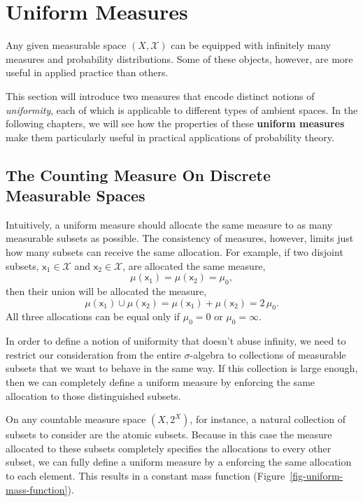 \documentclass[
  letterpaper,
  DIV=11,
  numbers=noendperiod]{scrartcl}
\begin{document}
\section{Uniform Measures}\label{uniform-measures}

Any given measurable space \((X, \mathcal{X})\) can be equipped with
infinitely many measures and probability distributions. Some of these
objects, however, are more useful in applied practice than others.

This section will introduce two measures that encode distinct notions of
\emph{uniformity}, each of which is applicable to different types of
ambient spaces. In the following chapters, we will see how the
properties of these \textbf{uniform measures} make them particularly
useful in practical applications of probability theory.

\subsection{The Counting Measure On Discrete Measurable
Spaces}\label{the-counting-measure-on-discrete-measurable-spaces}

Intuitively, a uniform measure should allocate the same measure to as
many measurable subsets as possible. The consistency of measures,
however, limits just how many subsets can receive the same allocation.
For example, if two disjoint subsets, \(\mathsf{x}_{1} \in \mathcal{X}\)
and \(\mathsf{x}_{2} \in \mathcal{X}\), are allocated the same measure,
\[
\mu(\mathsf{x}_{1}) = \mu(\mathsf{x}_{2}) = \mu_{0},
\] then their union will be allocated the measure, \[
\mu(\mathsf{x}_{1}) \cup \mu(\mathsf{x}_{2})
=
\mu(\mathsf{x}_{1}) + \mu(\mathsf{x}_{2})
=
2 \, \mu_{0}.
\] All three allocations can be equal only if \(\mu_{0} = 0\) or
\(\mu_{0} = \infty\).

In order to define a notion of uniformity that doesn't abuse infinity,
we need to restrict our consideration from the entire \(\sigma\)-algebra
to collections of measurable subsets that we want to behave in the same
way. If this collection is large enough, then we can completely define a
uniform measure by enforcing the same allocation to those distinguished
subsets.

On any countable measure space \((X, 2^{X})\), for instance, a natural
collection of subsets to consider are the atomic subsets. Because in
this case the measure allocated to these subsets completely specifies
the allocations to every other subset, we can fully define a uniform
measure by a enforcing the same allocation to each element. This results
in a constant mass function (Figure~\ref{fig-uniform-mass-function}).
\end{document}
